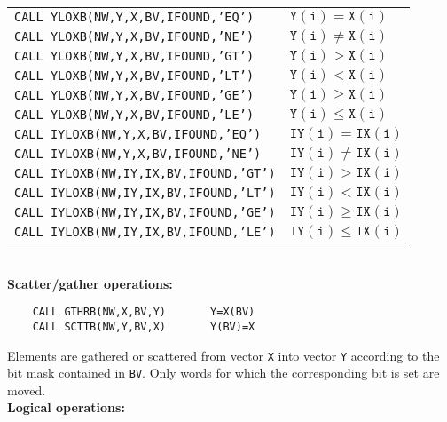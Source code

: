 \begin{tabular}{@{\hspace*{5mm}}l@{\qquad $\mathtt{BV(i)=1}$ \ if \ }l}
{\tt CALL YLOXB(NW,Y,X,BV,IFOUND,'EQ')} & $\mathtt{Y(i) = X(i)}$ \\
{\tt CALL YLOXB(NW,Y,X,BV,IFOUND,'NE')} & $\mathtt{Y(i) \ne X(i)}$ \\
{\tt CALL YLOXB(NW,Y,X,BV,IFOUND,'GT')} & $\mathtt{Y(i) > X(i)}$ \\
{\tt CALL YLOXB(NW,Y,X,BV,IFOUND,'LT')} & $\mathtt{Y(i) < X(i)}$ \\
{\tt CALL YLOXB(NW,Y,X,BV,IFOUND,'GE')} & $\mathtt{Y(i) \ge X(i)}$ \\
{\tt CALL YLOXB(NW,Y,X,BV,IFOUND,'LE')} & $\mathtt{Y(i) \le X(i)}$ \\
{\tt CALL IYLOXB(NW,Y,X,BV,IFOUND,'EQ')} & $\mathtt{IY(i) = IX(i)}$ \\
{\tt CALL IYLOXB(NW,Y,X,BV,IFOUND,'NE')} & $\mathtt{IY(i) \ne IX(i)}$\\
{\tt CALL IYLOXB(NW,IY,IX,BV,IFOUND,'GT')} & $\mathtt{IY(i) > IX(i)}$ \\
{\tt CALL IYLOXB(NW,IY,IX,BV,IFOUND,'LT')} & $\mathtt{IY(i) < IX(i)}$ \\
{\tt CALL IYLOXB(NW,IY,IX,BV,IFOUND,'GE')} & $\mathtt{IY(i) \ge IX(i)}$\\
{\tt CALL IYLOXB(NW,IY,IX,BV,IFOUND,'LE')} & $\mathtt{IY(i) \le IX(i)}$
\end{tabular} \\[3mm]
{\bf Scatter/gather operations:}
\begin{verbatim}
    CALL GTHRB(NW,X,BV,Y)       Y=X(BV)
    CALL SCTTB(NW,Y,BV,X)       Y(BV)=X
\end{verbatim}
Elements are gathered or scattered from vector {\tt X} into vector
{\tt Y} according to the bit mask contained in {\tt BV}. Only words for
which the corresponding bit is set are moved. \\[3mm]
{\bf Logical operations:} \\[3mm]
